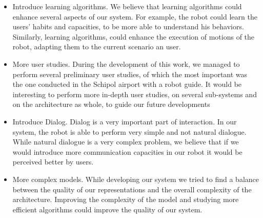 \begin{itemize}
\item Introduce learning algorithms. We believe that learning algorithms could enhance several aspects of our system. For example, the robot could learn the users' habits and capacities, to be more able to understand his behaviors. Similarly, learning algorithms, could enhance the execution of motions of the robot, adapting them to the current scenario an user.
\item More user studies. During the development of this work, we managed to perform several preliminary user studies, of which the most important was the one conducted in the Schipol airport with a robot guide. It would be interesting to perform more in-depth user studies, on several sub-systems and on the architecture as whole, to guide our future developments 
\item Introduce Dialog. Dialog is a very important part of interaction. In our system, the robot is able to perform very simple and not natural dialogue. While natural dialogue is a very complex problem, we believe that if we would introduce more communication capacities in our robot it would be perceived better by users.
\item More complex models. While developing our system we tried to find a balance between the quality of our representations and the overall complexity  of the architecture. Improving the complexity of the model and studying more efficient algorithms could improve the quality of our system.
\end{itemize}
